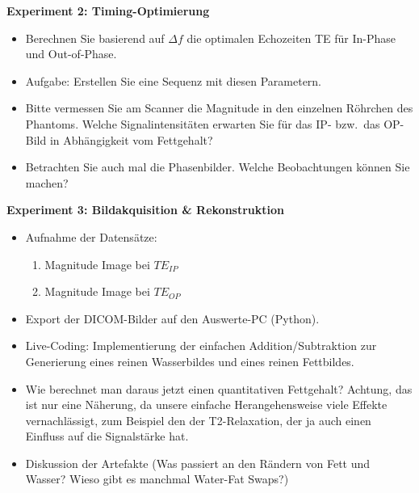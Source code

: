 \documentclass[a4paper,11pt]{article}
\newif\ifintern
\newcommand{\absatzkopf}[1]{\par\vspace{2pt}\textbf{#1}\par\nopagebreak}
\newcommand{\intern}[1]{\ifintern\begin{internbox}#1\end{internbox}\fi}
\newcommand{\TE}{\mathit{TE}}
\newcommand{\IP}{_{\mathit{IP}}}
\newcommand{\OP}{_{\mathit{OP}}}
\begin{document}
\absatzkopf{Experiment 2: Timing-Optimierung}
\begin{itemize}
\item Berechnen Sie basierend auf $\Delta f$ die optimalen Echozeiten TE für In-Phase und Out-of-Phase.
\item Aufgabe: Erstellen Sie eine Sequenz mit diesen Parametern.
\intern{Da geben wir natürlich schon eine super T1w GRE Sequenz mit nicht zu großem Flipwinkel und einer halbwegs kurzen TR vor :D. Daraus können sich die Studis ja dann eine Dual-Echo-Sequenz bauen.}
\item Bitte vermessen Sie am Scanner die Magnitude in den einzelnen Röhrchen des Phantoms. Welche Signalintensitäten erwarten Sie für das IP- bzw.\ das OP-Bild in Abhängigkeit vom Fettgehalt?
\item Betrachten Sie auch mal die Phasenbilder. Welche Beobachtungen können Sie machen?
\intern{Hier können wir dann die Studis \glqq lernen\grqq\ lassen, dass es neben den unterschiedlichen Wasser- und Fettanteilen in den verschiedenen Röhrchen auch noch eine andere Phasenkomponente zu geben scheint - Background Phase - und dass es Phase Wrapping gibt.}
\end{itemize}

\absatzkopf{Experiment 3: Bildakquisition \& Rekonstruktion}
\begin{itemize}
\item Aufnahme der Datensätze:
  \begin{enumerate}
  \item Magnitude Image bei $\TE\IP$
  \item Magnitude Image bei $\TE\OP$
  \end{enumerate}
\item Export der DICOM-Bilder auf den Auswerte-PC (Python).
\item Live-Coding: Implementierung der einfachen Addition/Subtraktion zur Generierung eines reinen Wasserbildes und eines reinen Fettbildes.
\item Wie berechnet man daraus jetzt einen quantitativen Fettgehalt? Achtung, das ist nur eine Näherung, da unsere einfache Herangehensweise viele Effekte vernachlässigt, zum Beispiel den der T2-Relaxation, der ja auch einen Einfluss auf die Signalstärke hat.
\item Diskussion der Artefakte (Was passiert an den Rändern von Fett und Wasser? Wieso gibt es manchmal Water-Fat Swaps?)
\intern{Müssten wir mal gucken, ob die bei unserem Phantom auftreten.}
\end{itemize}
\end{document}
